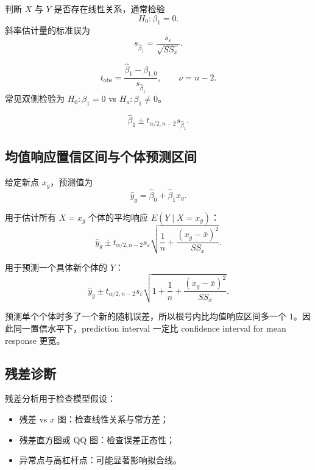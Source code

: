 \documentclass[11pt,a4paper]{article}
\theoremstyle{definition}
\theoremstyle{plain}
\theoremstyle{remark}
\begin{document}
判断 $X$ 与 $Y$ 是否存在线性关系，通常检验
\[
    H_0:\beta_1=0.
\]
斜率估计量的标准误为
\[
    s_{\hat\beta_1}
    =
    \frac{s_\varepsilon}{\sqrt{SS_x}}.
\]

\begin{memorybox}[必须记忆：斜率 t 检验]
\[
    \boxed{
    t_{\text{obs}}
    =
    \frac{\hat\beta_1-\beta_{1,0}}{s_{\hat\beta_1}},
    \qquad \nu=n-2.
    }
\]
常见双侧检验为 $H_0:\beta_1=0$ vs $H_a:\beta_1\ne 0$。
\end{memorybox}

\begin{memorybox}
\[
    \boxed{
    \hat\beta_1\pm t_{\alpha/2,n-2}s_{\hat\beta_1}.
    }
\]
\end{memorybox}

\subsection{均值响应置信区间与个体预测区间}

给定新点 $x_g$，预测值为
\[
    \hat y_g=\hat\beta_0+\hat\beta_1x_g.
\]

\begin{memorybox}
用于估计所有 $X=x_g$ 个体的平均响应 $E(Y\mid X=x_g)$：
\[
    \boxed{
    \hat y_g
    \pm
    t_{\alpha/2,n-2}s_\varepsilon
    \sqrt{
        \frac{1}{n}
        +
        \frac{(x_g-\bar x)^2}{SS_x}
    }.
    }
\]
\end{memorybox}

\begin{memorybox}
用于预测一个具体新个体的 $Y$：
\[
    \boxed{
    \hat y_g
    \pm
    t_{\alpha/2,n-2}s_\varepsilon
    \sqrt{
        1+
        \frac{1}{n}
        +
        \frac{(x_g-\bar x)^2}{SS_x}
    }.
    }
\]
\end{memorybox}

\begin{warnbox}[预测区间一定更宽]
预测单个个体时多了一个新的随机误差，所以根号内比均值响应区间多一个 $1$。因此同一置信水平下，prediction interval 一定比 confidence interval for mean response 更宽。
\end{warnbox}

\subsection{残差诊断}

残差分析用于检查模型假设：
\begin{itemize}
    \item 残差 vs $x$ 图：检查线性关系与常方差；
    \item 残差直方图或 QQ 图：检查误差正态性；
    \item 异常点与高杠杆点：可能显著影响拟合线。
\end{itemize}
\end{document}
